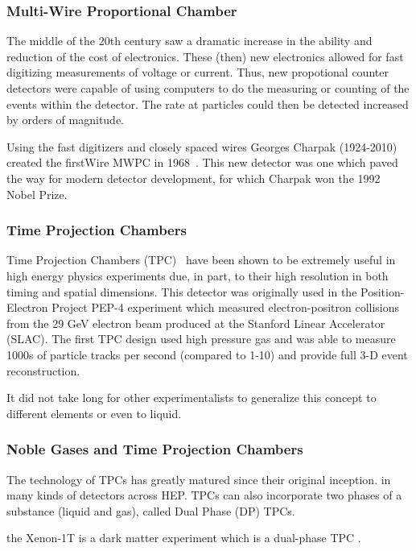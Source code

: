 \subsubsection{Multi-Wire Proportional Chamber}

The middle of the 20th century saw a dramatic increase in the ability and reduction of the cost of electronics.
These (then) new electronics allowed for fast digitizing measurements of voltage or current.
Thus, new propotional counter detectors were capable of using computers to do the measuring or counting of the events within the detector.
The rate at particles could then be detected increased by orders of magnitude.

Using the fast digitizers and closely spaced wires Georges Charpak (1924-2010) created the firstWire MWPC in 1968~\citep{Charpak:1968kd}.
This new detector was one which paved the way for modern detector development, for which Charpak won the 1992 Nobel Prize.


\subsubsection{Time Projection Chambers}

Time Projection Chambers (TPC)~\citep{lartpc:nygren} have been shown to be extremely useful in high energy physics experiments due, in part, to their high resolution in both timing and spatial dimensions.
This detector was originally used in the Position-Electron Project PEP-4 experiment which measured electron-positron collisions from the 29 GeV electron beam produced at the Stanford Linear Accelerator (SLAC).
The first TPC design used high pressure gas and was able to measure 1000s of particle tracks per second (compared to 1-10) and provide full 3-D event reconstruction.


It did not take long for other experimentalists to generalize this concept to different elements or even to liquid.


\subsubsection{Noble Gases and Time Projection Chambers}

The technology of TPCs has greatly matured since their original inception.
in many kinds of detectors across HEP. TPCs can also incorporate two phases of a substance (liquid and gas), called Dual Phase (DP) TPCs.

the Xenon-1T is a dark matter experiment which is a dual-phase TPC \citep{Aprile_2017_xenon1T}.

